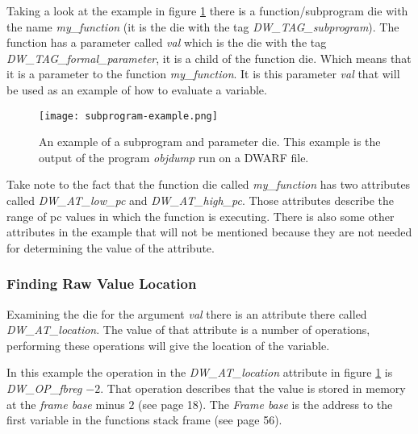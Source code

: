Taking a look at the example in figure \ref{fig:subprogramexample} there is a function/subprogram \gls{die} with the name \emph{my\_function} (it is the \gls{die} with the tag \emph{DW\_TAG\_subprogram}).
The function has a parameter called \emph{val} which is the \gls{die} with the tag \emph{DW\_TAG\_formal\_parameter}, it is a child of the function \gls{die}.
Which means that it is a parameter to the function \emph{my\_function}.
It is this parameter \emph{val} that will be used as an example of how to evaluate a variable.


\begin{figure}[h]
	\centering
	\texttt{[image: subprogram-example.png]}
	\caption{An example of a subprogram and parameter \gls{die}. This example is the output of the program \emph{objdump} run on a \gls{DWARF} file.}
	\label{fig:subprogramexample}
\end{figure}


Take note to the fact that the function \gls{die} called \emph{my\_function} has two attributes called \emph{DW\_AT\_low\_pc} and \emph{DW\_AT\_high\_pc}.
Those attributes describe the range of \gls{pc} values in which the function is executing.
There is also some other attributes in the example that will not be mentioned because they are not needed for determining the value of the attribute.




\subsubsection{Finding Raw Value Location}
Examining the \gls{die} for the argument \emph{val} there is an attribute there called \emph{DW\_AT\_location}.
The value of that attribute is a number of operations, performing these operations will give the location of the variable.


In this example the operation in the \emph{DW\_AT\_location} attribute in figure \ref{fig:subprogramexample} is \emph{DW\_OP\_fbreg $-2$}.
That operation describes that the value is stored in memory at the \emph{frame base} minus $2$ (see \cite{dwarf} page 18).
The \emph{Frame base} is the address to the first variable in the functions stack frame (see \cite{dwarf} page 56).


